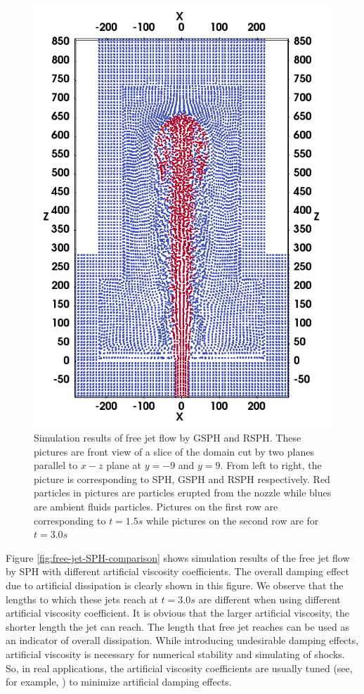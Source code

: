 \begin{figure}
\begin{minipage}[t]{.325\textwidth}
        \includegraphics[width=0.99 \textwidth]{./Chapter-4/Figures/RSPH-t3-cutView}
    \end{minipage}%
    \caption{Simulation results of free jet flow by GSPH and RSPH. These pictures are front view of a slice of the domain cut by two planes parallel to $x-z$ plane at $y=-9$ and $y=9$. From left to right, the picture is corresponding to SPH, GSPH and RSPH respectively. Red particles in pictures are particles erupted from the nozzle while blues are ambient fluids particles. Pictures on the first row are corresponding to $t=1.5s$ while pictures on the second row are for $t=3.0 s$}
    \label{fig:free-jet-comparison}
\end{figure}

Figure \ref{fig:free-jet-SPH-comparison} shows simulation results of the free jet flow by SPH with different artificial viscosity coefficients. The overall damping effect due to artificial dissipation is clearly shown in this figure. We observe that the lengths to which these jets reach at $t=3.0 s$ are different when using different artificial viscosity coefficient. It is obvious that the larger artificial viscosity, the shorter length the jet can reach. The length that free jet reaches can be used as an indicator of overall dissipation. While introducing undesirable damping effects, artificial viscosity is necessary for numerical stability and simulating of shocks. So, in real applications, the artificial viscosity coefficients are usually tuned (see, for example, \citep{gmd-2017-119}) to minimize artificial damping effects.

